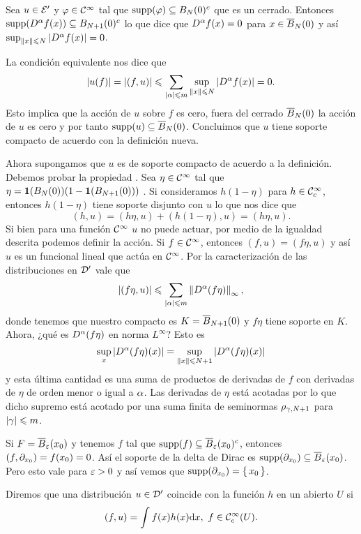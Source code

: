 \documentclass[12pt]{memoir}
\begin{document}
\begin{ptcbp}
  Sea $u\in\mathcal{E}'$ y $\varphi\in\mathcal{C}^\infty$ tal que $\operatorname{supp}(\varphi)\subseteq B_N(0)^c$ que es un cerrado. Entonces  $\operatorname{supp}(D^\alpha f(x))\subseteq B_{N+1}(0)^c$ lo que dice que $D^\alpha f(x)=0$ para $x\in\overline B_N(0)$ y así $\sup_{\left\|x\right\|\leqslant N}|D^\alpha f(x)|=0$.\par 
  La condición equivalente nos dice que 
  $$|u(f)|=|(f,u)|\leqslant\sum_{|\alpha|\leqslant m}\sup_{\left\|x\right\|\leqslant N}|D^\alpha f(x)|=0.$$
  Esto implica que la acción de $u$ sobre $f$ es cero, fuera del cerrado $\overline B_N(0)$ la acción de $u$ es cero y por tanto $\operatorname{supp}(u)\subseteq \overline B_N(0)$. Concluimos que $u$ tiene soporte compacto de acuerdo con la definición nueva.\par 
  Ahora supongamos que $u$ es de soporte compacto de acuerdo a la definición. Debemos probar la propiedad . Sea $\eta\in\mathcal{C}^\infty$ tal que $\eta=\mathbf{1}(B_N(0))(1-\mathbf{1}(B_{N+1}(0)))$ . Si consideramos $h(1-\eta)$ para $h\in\mathcal{C}^\infty_c$, entonces $h(1-\eta)$ tiene soporte disjunto con $u$ lo que nos dice que
  $$(h,u)=(h\eta,u)+(h(1-\eta),u)=(h\eta,u).$$
  Si bien para una función $\mathcal{C}^\infty$ $u$ no puede actuar, por medio de la igualdad descrita podemos definir la acción. Si $f\in\mathcal{C}^\infty$, entonces $(f,u)=(f\eta, u)$ y así $u$ es un funcional lineal que actúa en $\mathcal{C}^\infty$. Por la caracterización de las distribuciones en $\mathcal{D}'$ vale que 
  $$|(f\eta,u)|\leqslant\sum_{|\alpha|\leqslant m}\left\|D^\alpha(f\eta)\right\|_{\infty},$$
  donde tenemos que nuestro compacto es $K=\overline B_{N+1}(0)$ y $f\eta$ tiene soporte en $K$. Ahora, ¿qué es $D^\alpha(f\eta)$ en norma $L^\infty$? Esto es 
  $$\sup_{x}|D^\alpha(f\eta)(x)|=\sup_{\left\|x\right\|\leqslant N+1}|D^\alpha(f\eta)(x)|$$
  y esta última cantidad es una suma de productos de derivadas de $f$ con derivadas de $\eta$ de orden menor o igual a $\alpha$. Las derivadas de $\eta$ está acotadas por lo que dicho supremo está acotado por una suma finita de seminormas $\rho_{\gamma,N+1}$ para $|\gamma|\leqslant m$. 
\end{ptcbp}

\begin{Ex}
  Si $F=\overline B_\varepsilon(x_0)$ y tenemos $f$ tal que $\operatorname{supp}(f)\subseteq \overline{B}_\varepsilon(x_0)^c$, entonces $(f,\partial_{x_0})=f(x_0)=0$. Así el soporte de la delta de Dirac es $\operatorname{supp}(\partial_{x_0})\subseteq\overline B_\varepsilon(x_0)$. Pero esto vale para $\varepsilon>0$ y así vemos que $\operatorname{supp}(\partial_{x_0})=\{\,x_0\,\}$.
\end{Ex}

\begin{Def}
  Diremos que una distribución $u\in\mathcal{D}'$ coincide con la función $h$ en un abierto $U$ si 
  $$(f,u)=\int f(x)h(x)\dd x,\ f\in\Coo_c(U).$$
\end{Def}
\end{document}
